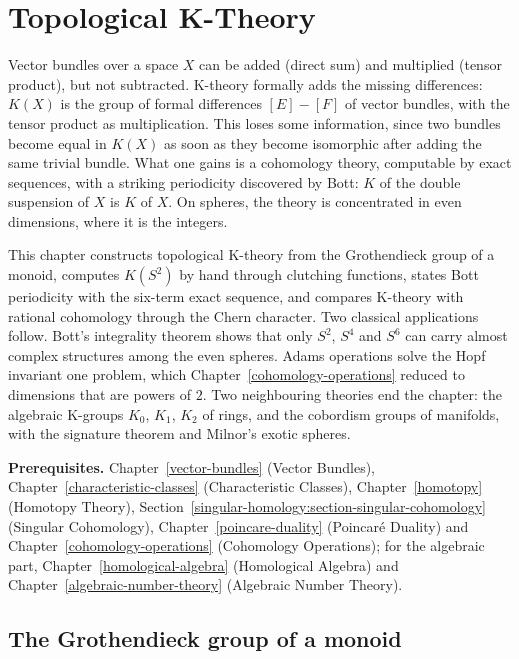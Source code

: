 \chapter{Topological K-Theory}\label{k-theory}

Vector bundles over a space $X$ can be added (direct sum) and multiplied (tensor product), but not subtracted. K-theory formally adds the missing differences: $K(X)$ is the group of formal
differences $[E] - [F]$ of vector bundles, with the tensor product as multiplication. This loses some information, since two bundles become equal in $K(X)$ as soon as they become isomorphic
after adding the same trivial bundle. What one gains is a cohomology theory, computable by exact sequences, with a striking periodicity discovered by Bott: $K$ of the double suspension of $X$ is $K$ of
$X$. On spheres, the theory is concentrated in even dimensions, where it is the integers.

This chapter constructs topological K-theory from the Grothendieck group of a monoid, computes $K(S^2)$ by hand through clutching functions, states Bott periodicity with the six-term exact sequence, and
compares K-theory with rational cohomology through the Chern character. Two classical applications follow. Bott's integrality theorem shows that only $S^2$, $S^4$ and $S^6$ can carry almost complex
structures among the even spheres. Adams operations solve the Hopf invariant one problem, which Chapter~\ref{cohomology-operations} reduced to dimensions that are powers of $2$. Two neighbouring
theories end the chapter: the algebraic K-groups $K_0$, $K_1$, $K_2$ of rings, and the cobordism groups of manifolds, with the signature theorem and Milnor's exotic spheres.

\noindent\textbf{Prerequisites.} Chapter~\ref{vector-bundles} (Vector Bundles), Chapter~\ref{characteristic-classes} (Characteristic Classes), Chapter~\ref{homotopy} (Homotopy Theory),
Section~\ref{singular-homology:section-singular-cohomology} (Singular Cohomology), Chapter~\ref{poincare-duality} (Poincar\'e Duality) and Chapter~\ref{cohomology-operations} (Cohomology Operations);
for the algebraic part, Chapter~\ref{homological-algebra} (Homological Algebra) and Chapter~\ref{algebraic-number-theory} (Algebraic Number Theory).

\section{The Grothendieck group of a monoid}\label{k-theory:section-grothendieck-group}

